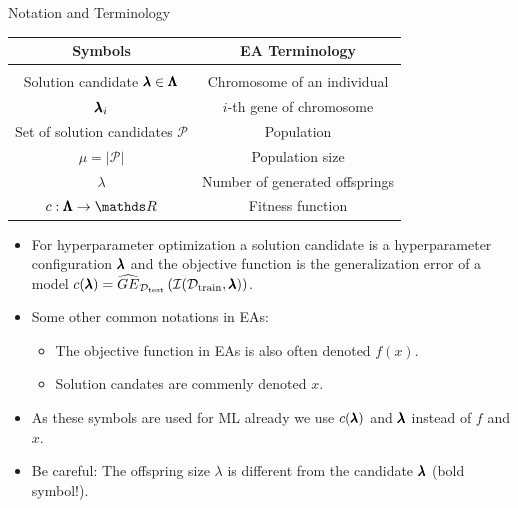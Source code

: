 \begin{frame}[allowframebreaks]{Notation and Terminology}

\begin{center}
\begin{tabular}{ c | c }
\textbf{Symbols} & \textbf{EA Terminology} \\[0.05cm]
\hline \\[0.01cm]
Solution candidate $\pmb{\lambda} \in \pmb{\Lambda}$ & Chromosome of an individual \\[0.1cm]
$\pmb{\lambda}_{i}$& $i$-th gene of chromosome\\[0.1cm]
Set of solution candidates $\mathcal{P}$ & Population \\[0.1cm]
$\mu = |\mathcal{P}|$ & Population size \\[0.1cm]
$\lambda$ & Number of generated offsprings\\[0.1cm]
$\f: \XX \to \R$ & Fitness function
\end{tabular}
\end{center}

\framebreak

\begin{itemize}
    \item For hyperparameter optimization a solution candidate is a hyperparameter configuration $\pmb{\lambda}$ and the objective function is the generalization error of a model $c(\pmb{\lambda}) = \widehat{GE}_{\mathcal{D}_{\text{test}}}\left(\mathcal{I}(\mathcal{D}_{\text{train}}, \pmb{\lambda})\right)$.
    \item Some other common notations in EAs:
    \begin{itemize}
        \item The objective function in EAs is also often denoted $f(x)$.
        \item Solution candates are commenly denoted $x$.
    \end{itemize}
    \item As these symbols are used for ML already we use $c(\pmb{\lambda})$ and $\pmb{\lambda}$ instead of $f$ and $x$.
    \item Be careful: The offspring size $\lambda$ is different from the candidate $\pmb{\lambda}$ (bold symbol!).
\end{itemize}
\end{frame}


